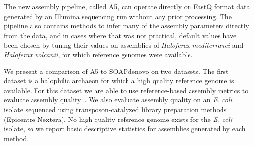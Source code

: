 \documentclass{bioinfo}
\begin{document}
The new assembly pipeline, called A5, can operate directly on FastQ format data generated by an Illumina sequencing run
without any prior processing. The pipeline also contains methods to infer many of the assembly parameters directly
from the data, and in cases where that was not practical, default values have been chosen by tuning their values on 
assemblies of \textit{Haloferax mediterranei} and \textit{Haloferax volcanii}, for which reference genomes were available.

We present a comparison of A5 to SOAPdenovo on two datasets. The first dataset
is a halophilic archaeon for which a high quality reference genome is available. For this dataset we are able to use
reference-based assembly metrics to evaluate assembly quality~\citep{Darling2011}. We also evaluate assembly quality on an 
\textit{E. coli} isolate sequenced using transposon-catalyzed library preparation methods (Epicentre Nextera). 
No high quality reference genome exists for the \textit{E. coli} isolate, so we report basic descriptive statistics for assemblies
generated by each method.  
\end{document}
